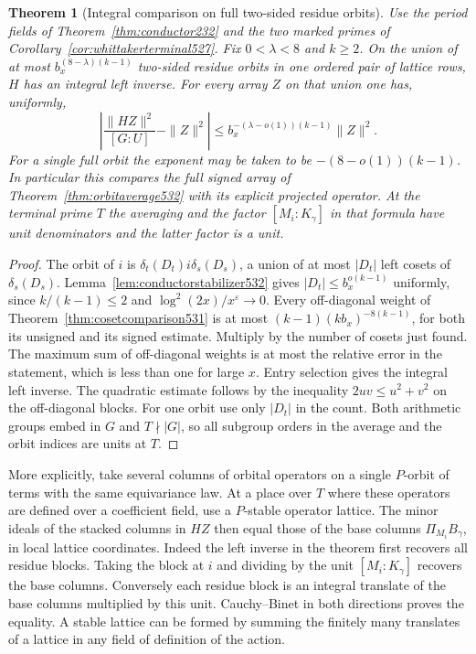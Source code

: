 \documentclass[a4paper,11pt]{article}
\newtheorem{theorem}[proposition]{Theorem}
\theoremstyle{definition}
\theoremstyle{remark}
\numberwithin{equation}{section}
\begin{document}
\begin{theorem}[Integral comparison on full two-sided residue orbits]
\leavevmode\label{thm:doubleorbit532}
Use the period fields of Theorem~\ref{thm:conductor232} and
the two marked primes of Corollary~\ref{cor:whittakerterminal527}.
Fix \(0<\lambda<8\) and \(k\ge2\). On the union of at most
\(b_x^{(8-\lambda)(k-1)}\) two-sided residue orbits in one
ordered pair of lattice rows, \(H\) has an integral left inverse.
For every array \(Z\) on that union one has, uniformly,
\[
  \left|\frac{\|HZ\|^2}{[G:U]}-\|Z\|^2\right|
       \le b_x^{-(\lambda-o(1))(k-1)}\|Z\|^2 .
\]
For a single full orbit the exponent may be taken to be
\(-(8-o(1))(k-1)\). In particular this compares the full
signed array of Theorem~\ref{thm:orbitaverage532} with its
explicit projected operator. At the terminal prime \(T\) the
averaging and the factor \([M_i:K_\gamma]\) in that formula
have unit denominators and the latter factor is a unit.
\end{theorem}
\begin{proof}
The orbit of \(i\) is \(\delta_t(D_t)i\delta_s(D_s)\), a union
of at most \(|D_t|\) left cosets of \(\delta_s(D_s)\).
Lemma~\ref{lem:conductorstabilizer532} gives
\(|D_t|\le b_x^{o(k-1)}\) uniformly, since
\(k/(k-1)\le2\) and \(\log^2(2x)/x^\varepsilon\to0\).
Every off-diagonal weight of Theorem~\ref{thm:cosetcomparison531}
is at most \((k-1)(kb_x)^{-8(k-1)}\), for both its unsigned and
its signed estimate. Multiply by the number of cosets just found.
The maximum sum of off-diagonal weights is at most the relative
error in the statement, which is less than one for large \(x\).
Entry selection gives the integral left inverse. The quadratic
estimate follows by the inequality \(2uv\le u^2+v^2\) on the
off-diagonal blocks. For one orbit use only \(|D_t|\) in the
count. Both arithmetic groups embed in \(G\) and \(T\nmid|G|\),
so all subgroup orders in the average and the orbit indices are
units at \(T\).
\end{proof}

More explicitly, take several columns of orbital operators on a
single \(P\)-orbit of terms with the same equivariance law.
At a place over \(T\) where these operators are defined over a
coefficient field, use a \(P\)-stable operator lattice. The
minor ideals of the stacked columns in \(HZ\) then equal those
of the base columns \(\Pi_{M_i}B_\gamma\), in local lattice
coordinates. Indeed the left inverse in the theorem first
recovers all residue blocks. Taking the block at \(i\) and
dividing by the unit \([M_i:K_\gamma]\) recovers the base
columns. Conversely each residue block is an integral translate
of the base columns multiplied by this unit. Cauchy--Binet in
both directions proves the equality. A stable lattice can be
formed by summing the finitely many translates of a lattice in
any field of definition of the action.
\end{document}
